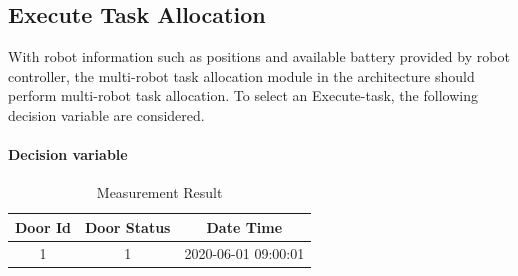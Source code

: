 \subsection{Execute Task Allocation}
With robot information such as positions and available battery provided by robot controller, the multi-robot task allocation module in the architecture should perform multi-robot task allocation. To select an Execute-task, the following decision variable are considered.
\paragraph*{Decision variable}


\begin{table}[htb]
\centering
\begin{tabular}{|c| c| c|} 
\hline
Door Id & Door Status & Date Time \\
\hline
1& 1 & 2020-06-01 09:00:01 \\ [1ex] 
\hline
\end{tabular}
\caption{Measurement Result}
\label{tab:measurement_result}
\end{table}

\begin{table}[htb]
\centering
{}
\caption{Door Open Possibility}
\label{tab:open_possibilities}
\end{table}

